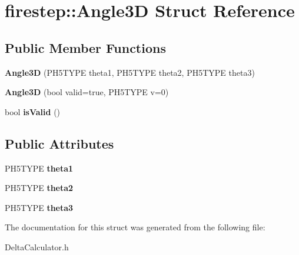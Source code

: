 \hypertarget{structfirestep_1_1_angle3_d}{\section{firestep\+:\+:Angle3\+D Struct Reference}
\label{structfirestep_1_1_angle3_d}
}
\subsection*{Public Member Functions}
\begin{DoxyCompactItemize}
\item 
\hypertarget{structfirestep_1_1_angle3_d_a4acfb2b9f7030de3feb1434f639b313b}{{\bfseries Angle3\+D} (P\+H5\+T\+Y\+P\+E theta1, P\+H5\+T\+Y\+P\+E theta2, P\+H5\+T\+Y\+P\+E theta3)}\label{structfirestep_1_1_angle3_d_a4acfb2b9f7030de3feb1434f639b313b}

\item 
\hypertarget{structfirestep_1_1_angle3_d_aaab46a664fbb8063fa65fd5b06dda80f}{{\bfseries Angle3\+D} (bool valid=true, P\+H5\+T\+Y\+P\+E v=0)}\label{structfirestep_1_1_angle3_d_aaab46a664fbb8063fa65fd5b06dda80f}

\item 
\hypertarget{structfirestep_1_1_angle3_d_a2f874eae789c241d118ff48d2a7d09ec}{bool {\bfseries is\+Valid} ()}\label{structfirestep_1_1_angle3_d_a2f874eae789c241d118ff48d2a7d09ec}

\end{DoxyCompactItemize}
\subsection*{Public Attributes}
\begin{DoxyCompactItemize}
\item 
\hypertarget{structfirestep_1_1_angle3_d_a28b8b9a9d98b41455f0aa3793c815049}{P\+H5\+T\+Y\+P\+E {\bfseries theta1}}\label{structfirestep_1_1_angle3_d_a28b8b9a9d98b41455f0aa3793c815049}

\item 
\hypertarget{structfirestep_1_1_angle3_d_a34d458a797afacbb2359179f22d74e37}{P\+H5\+T\+Y\+P\+E {\bfseries theta2}}\label{structfirestep_1_1_angle3_d_a34d458a797afacbb2359179f22d74e37}

\item 
\hypertarget{structfirestep_1_1_angle3_d_ae22c7cd1653d71bad01b55899a861f1d}{P\+H5\+T\+Y\+P\+E {\bfseries theta3}}\label{structfirestep_1_1_angle3_d_ae22c7cd1653d71bad01b55899a861f1d}

\end{DoxyCompactItemize}


The documentation for this struct was generated from the following file\+:\begin{DoxyCompactItemize}
\item 
Delta\+Calculator.\+h\end{DoxyCompactItemize}
